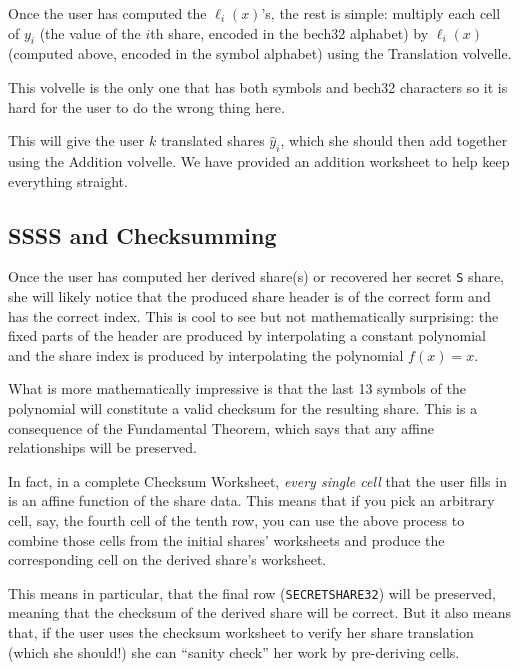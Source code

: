 \documentclass[letterpaper]{article}
\theoremstyle{xxx}
\theoremstyle{evil}
\theoremstyle{yyy}
\theoremstyle{plain}
\theoremstyle{zzz}
\begin{document}
Once the user has computed the $\ell_i(x)$'s, the rest is simple: multiply each
cell of $y_i$ (the value of the $i$th share, encoded in the bech32 alphabet) by
$\ell_i(x)$ (computed above, encoded in the symbol alphabet) using the Translation
volvelle.

This volvelle is the only one that has both symbols and bech32 characters
so it is hard for the user to do the wrong thing here.

This will give the user $k$ translated shares $\hat{y}_i$, which she should then
add together using the Addition volvelle. We have provided an addition worksheet
to help keep everything straight.

\subsection{SSSS and Checksumming}

Once the user has computed her derived share(s) or recovered her secret \texttt{S}
share, she will likely notice that the produced share header is of the correct form
and has the correct index. This is cool to see but not mathematically surprising:
the fixed parts of the header are produced by interpolating a constant polynomial
and the share index is produced by interpolating the polynomial $f(x) = x$.

What is more mathematically impressive is that the last 13 symbols of the polynomial
will constitute a valid checksum for the resulting share. This is a consequence of
the Fundamental Theorem, which says that any affine relationships will be preserved.

In fact, in a complete Checksum Worksheet, \emph{every single cell} that the user
fills in is an affine function of the share data. This means that if you pick an
arbitrary cell, say, the fourth cell of the tenth row, you can use the above process
to combine those cells from the initial shares' worksheets and produce the
corresponding cell on the derived share's worksheet.

This means in particular, that the final row (\texttt{SECRETSHARE32}) will be
preserved, meaning that the checksum of the derived share will be correct. But it
also means that, if the user uses the checksum worksheet to verify her share
translation (which she should!) she can ``sanity check'' her work by pre-deriving
cells.
\end{document}
